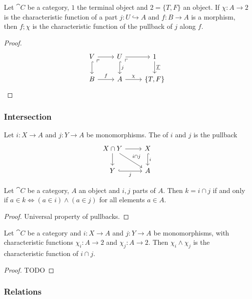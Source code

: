\begin{proposition}
Let $\cat{C}$ be a category, $1$ the terminal object and $2 = \{T,F\}$ an object. If $\chi: A\to 2$ is the characteristic function of a part $j: U\hookrightarrow A$ and $f: B\to A$ is a morphism, then $f;\chi$ is the characteristic function of the pullback of $j$ along $f$.
\end{proposition}
\begin{proof}
\[ \begin{tikzcd}
V \pbCorner \rar \arrow[d, hook] & U \arrow[r] \arrow[d, hook, "j"] \pbCorner & 1 \arrow[d, "\underline{T}"] \\
B \arrow[r, "f"] & A \arrow[r, "\chi"] & \{T,F\}
\end{tikzcd} \]
\end{proof}

\subsubsection{Intersection}
\begin{definition}
Let $i: X\to A$ and $j: Y\to A$ be monomorphisms. The  of $i$ and $j$ is the pullback
\[ \begin{tikzcd}
X\cap Y \arrow[r] \arrow[d] \arrow[dr, "i\cap j"] & X \arrow[d, hook, "i"] \\
Y \arrow[r, hook, swap, "j"] & A
\end{tikzcd} \]
\end{definition}

\begin{lemma}
Let $\cat{C}$ be a category, $A$ an object and $i,j$ parts of $A$. Then $k = i\cap j$ \textup{if and only if} $a\in k \iff (a\in i)\land(a\in j)$ for all elements $a\in A$.
\end{lemma}
\begin{proof}
Universal property of pullbacks.
\end{proof}

\begin{proposition}
Let $\cat{C}$ be a category and  $i: X\to A$ and $j: Y\to A$ be monomorphisms, with characteristic functions $\chi_i: A\to 2$ and $\chi_j: A\to 2$. Then $\chi_i \land \chi_j$ is the characteristic function of $i\cap j$.
\end{proposition}
\begin{proof}
TODO
\end{proof}

\subsubsection{Relations}

